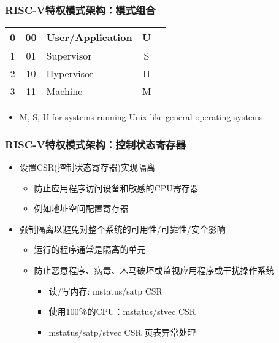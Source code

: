 
\begin{frame}
		\frametitle{RISC-V特权模式架构：\small{模式组合}}
\begin{table}[h]
 	\centering
 	\begin{tabular}{|c|c|l|c|l|}
 	\hline
	0 & 00 & User/Application & U \\\hline
	1 & 01 & Supervisor & S \\\hline
	2 & 10 & Hypervisor & H \\\hline
	3 & 11 & Machine & M \\\hline
   \end{tabular}
   \end{table}
\begin{itemize}
	
	\item M, S, U  for systems running Unix-like general operating systems
\end{itemize}


\end{frame}


\begin{frame}
	\frametitle{RISC-V特权模式架构：\small{控制状态寄存器}}

	\begin{itemize}
		\item 设置CSR(控制状态寄存器)实现隔离
		\begin{itemize}
			\item 防止应用程序访问设备和敏感的CPU寄存器
			\item 例如地址空间配置寄存器
		\end{itemize} 
	\end{itemize}

	\begin{itemize}
		\item 强制隔离以避免对整个系统的可用性/可靠性/安全影响
		\begin{itemize}
		\item 运行的程序通常是隔离的单元
		\item 防止恶意程序、病毒、木马破坏或监视应用程序或干扰操作系统	
			\begin{itemize}
			\item 读/写内存: mstatus/satp CSR
			\item 使用100％的CPU：mstatus/stvec CSR
			\pause

			 	\item mstatus/satp/stvec CSR 页表异常处理

			\end{itemize}
		\end{itemize}
	\end{itemize}

\end{frame}


